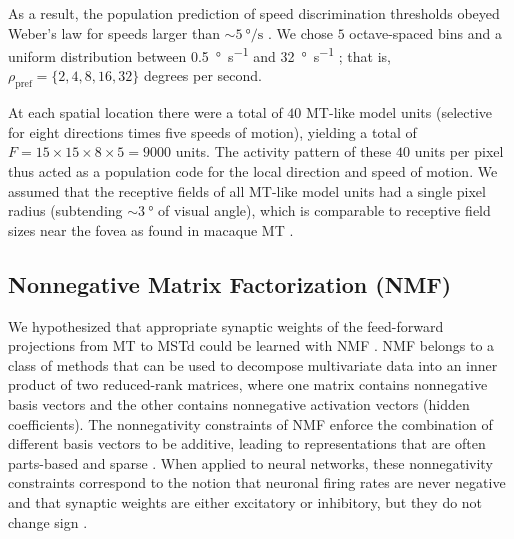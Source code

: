 As a result, the population prediction of speed discrimination thresholds 
obeyed Weber's law for speeds larger than $\sim\SI{5}{\degree\per\second}$
\citep{Nover2005}. We chose $5$ octave-spaced bins and a uniform distribution
between \SI{0.5}{\degree\per\second} and \SI{32}{\degree\per\second}
\citep{Nover2005}; that is, $\rho_{\textrm{pref}}=\{2,4,8,16,32\}$ degrees
per second.

At each spatial location there were a total of $40$ \ac{MT}-like model units
(selective for eight directions times five speeds of motion), yielding a total
of $F = 15 \times 15 \times 8 \times 5 = 9000$ units. The activity pattern
of these $40$ units per pixel thus acted as a population code for the local
direction and speed of motion. We assumed that the receptive fields of all
\ac{MT}-like model units had a single pixel radius (subtending 
$\sim\SI{3}{\degree}$ of visual angle), which is comparable to receptive field
sizes near the fovea as found in macaque \ac{MT} \citep{Raiguel1995}.


\subsection{Nonnegative Matrix Factorization (NMF)}
\label{sec:MSTd|methods|NMF}
We hypothesized that appropriate synaptic weights of the feed-forward 
projections from \ac{MT} to \ac{MSTd} could be learned with \ac{NMF} 
\citep{PaateroTapper1994,LeeSeung1999,LeeSeung2001}.
\ac{NMF} belongs to a class of methods that can be used to decompose 
multivariate data into an inner product of two reduced-rank matrices, 
where one matrix contains nonnegative basis vectors and the other contains
nonnegative activation vectors (hidden coefficients). The nonnegativity 
constraints of \ac{NMF} enforce the combination of different basis vectors 
to be additive, leading to representations that are often parts-based and 
sparse \citep{LeeSeung1999}. When applied to neural networks, these 
nonnegativity constraints correspond to the notion that neuronal firing rates 
are never negative and that synaptic weights are either excitatory or 
inhibitory, but they do not change sign \citep{LeeSeung1999}.

